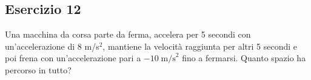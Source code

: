 \documentclass[12pt,a4paper]{book}
\begin{document}

\subsection*{Esercizio 12}
Una macchina da corsa parte da ferma, accelera per 5 secondi con un'accelerazione di 8 m/s$^2$, mantiene la velocità raggiunta per altri 5 secondi e poi frena con un'accelerazione pari a $-10 \; \text{m/s}^2$ fino a fermarsi. Quanto spazio ha percorso in tutto?
\end{document}
